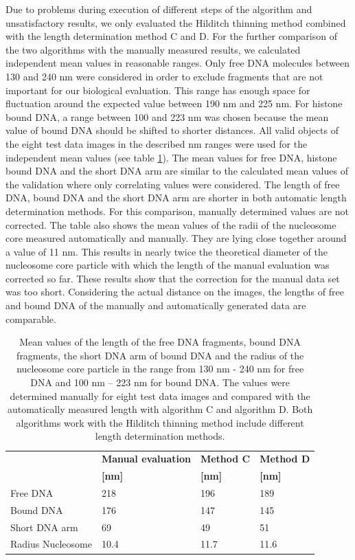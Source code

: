 \documentclass{article}
\begin{document}

Due to problems during execution of different steps of the algorithm and unsatisfactory results, we only evaluated the Hilditch thinning method combined with the length determination method C and D. For the further comparison of the two algorithms with the manually measured results, we calculated independent mean values in reasonable ranges. Only free DNA molecules between 130 and 240 nm were considered in order to exclude fragments that are not important for our biological evaluation. This range has enough space for fluctuation around the expected value between 190 nm and 225 nm. For histone bound DNA, a range between 100 and 223 nm was chosen because the mean value of bound DNA should be shifted to shorter distances. 
All valid objects of the eight test data images in the described nm ranges were used for the independent mean values (see table \ref{tab:means}).
The mean values for free DNA, histone bound DNA and the short DNA arm are similar to the calculated mean values of the validation where only correlating values were considered. The length of free DNA, bound DNA and the short DNA arm are shorter in both automatic length determination methods. For this comparison, manually determined values are not corrected. The table also shows the mean values of the radii of the nucleosome core measured automatically and manually. They are lying close together around a value of 11 nm. This results in nearly twice the theoretical diameter of the nucleosome core particle with which the length of the manual evaluation was corrected so far. These results show that the correction for the manual data set was too short. Considering the actual distance on the images, the lengths of free and bound DNA of the manually and automatically generated data are comparable.
%
\begin{table}[!htbp]
	\centering
	\caption{Mean values of the length of the free DNA fragments, bound DNA fragments, the short DNA arm of bound DNA and the radius of the nucleosome core particle in the range from 130 nm - 240 nm for free DNA and 100 nm – 223 nm for bound DNA. The values were determined manually for eight test data images and compared with the automatically measured length with algorithm C and algorithm D. Both algorithms work with the Hilditch thinning method include different length determination methods.}
	\begin{tabular*}{\textwidth}{llll} \hline
		\textbf{} & \textbf{Manual evaluation} & \textbf{Method C} & \textbf{Method D} \\ 
		\textbf{} & \textbf{[nm]} & \textbf{[nm]} & \textbf{[nm]} \\ \hline
		Free DNA & 218   & 196   & 189 \\
		Bound DNA & 176   & 147   & 145 \\
		Short DNA arm & 69    & 49    & 51 \\
		Radius Nucleosome & 10.4  & 11.7  & 11.6 \\ \hline
	\end{tabular*}%
	\label{tab:means}%
\end{table}%
\end{document}
